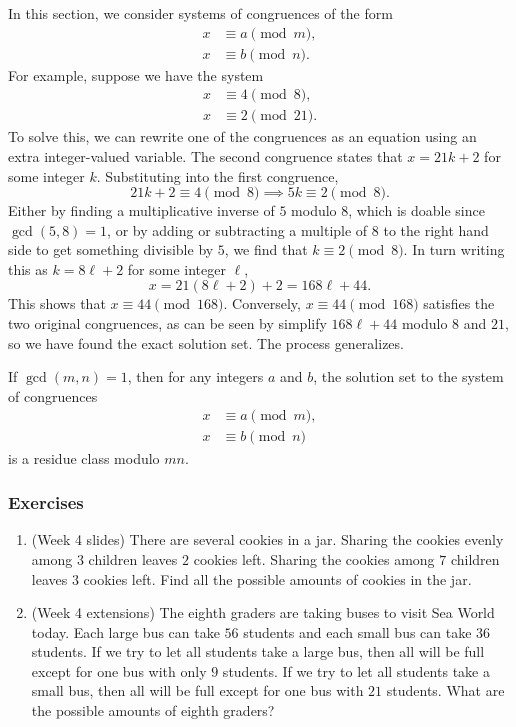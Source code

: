 In this section, we consider systems of congruences of the form
\begin{align*}
x &\equiv a\pmod{m}, \\
x &\equiv b\pmod{n}.
\end{align*}
For example, suppose we have the system
\begin{align*}
x &\equiv 4\pmod{8}, \\
x &\equiv 2\pmod{21}.
\end{align*}
To solve this, we can rewrite one of the congruences as an equation using an extra integer-valued variable. The second congruence states that $x = 21k + 2$ for some integer $k$. Substituting into the first congruence,
\begin{equation*}
21k + 2\equiv 4\pmod{8}\implies 5k\equiv 2\pmod{8}.
\end{equation*}
Either by finding a multiplicative inverse of $5$ modulo $8$, which is doable since $\gcd(5,8) = 1$, or by adding or subtracting a multiple of $8$ to the right hand side to get something divisible by $5$, we find that $k\equiv 2\pmod{8}$. In turn writing this as $k = 8\ell + 2$ for some integer $\ell$,
\begin{equation*}
x = 21(8\ell + 2) + 2 = 168\ell + 44.
\end{equation*}
This shows that $\boxed{x\equiv 44\pmod{168}}$. Conversely, $x\equiv 44\pmod{168}$ satisfies the two original congruences, as can be seen by simplify $168\ell + 44$ modulo $8$ and $21$, so we have found the exact solution set. The process generalizes.

\begin{theorem}\label{thm:crt}
If $\gcd(m,n) = 1$, then for any integers $a$ and $b$, the solution set to the system of congruences
\begin{align*}
x &\equiv a\pmod{m}, \\
x &\equiv b\pmod{n}
\end{align*}
is a residue class modulo $mn$.
\end{theorem}

\subsubsection*{Exercises}

\begin{enumerate}
\item (Week 4 slides) There are several cookies in a jar. Sharing the cookies evenly among $3$ children leaves $2$ cookies left. Sharing the cookies among $7$ children leaves $3$ cookies left. Find all the possible amounts of cookies in the jar.
\item (Week 4 extensions) The eighth graders are taking buses to visit Sea World today. Each large bus can take $56$ students and each small bus can take $36$ students. If we try to let all students take a large bus, then all will be full except for one bus with only $9$ students. If we try to let all students take a small bus, then all will be full except for one bus with $21$ students. What are the possible amounts of eighth graders?
\end{enumerate}


